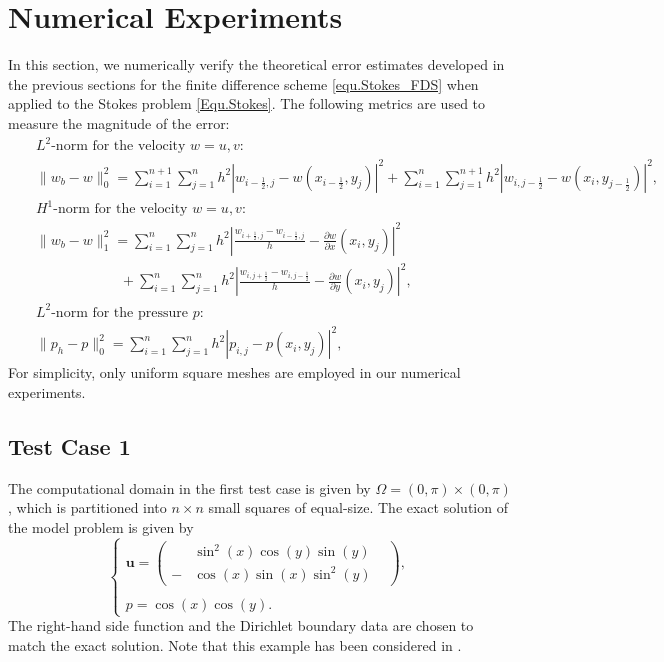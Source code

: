 \documentclass[final,leqno]{siamltex704}
\begin{document}
\section{Numerical Experiments}\label{numerical-experiments}
In this section, we numerically verify the theoretical error estimates developed in the previous sections for the finite difference scheme \eqref{equ.Stokes_FDS} when applied to the Stokes problem \eqref{Equ.Stokes}.
The following metrics are used to measure the magnitude of the error:
\begin{eqnarray*}
&&\text{$L^2$-norm for the velocity $w=u,v$: }\\
&&\|w_b-w\|_{0}^2=\sum_{i=1}^{n+1}\sum_{j=1}^{n}h^2|w_{i-\frac{1}{2},j}-w(x_{i-\frac{1}{2}},y_j)|^2  +\sum_{i=1}^{n}\sum_{j=1}^{n+1}h^2|w_{i,j-\frac{1}{2}}-w(x_{i},y_{j-\frac{1}{2}})|^2,\\
&&\text{$H^1$-norm for the velocity $w=u,v$: }\\
&&\|w_b-w\|_1^2=\sum_{i=1}^{n}\sum_{j=1}^{n} h^2\left|\frac{w_{i+\frac{1}{2},j}-w_{i-\frac{1}{2},j}}{h} - \frac{\partial w}{\partial x} (x_{i},y_{j})\right|^2 \nonumber\\
&&\qquad\qquad\qquad  + \sum_{i=1}^{n}\sum_{j=1}^{n} h^2\left|\frac{w_{i,j+\frac{1}{2}}-w_{i,j-\frac{1}{2}}}{h} - \frac{\partial w}{\partial y} (x_{i},y_{j})\right|^2,\\
&&\text{$L^2$-norm for the pressure $p$: }\\
&&\|p_h-p\|_0^2= \sum_{i=1}^{n}\sum_{j=1}^{n} h^2|p_{i,j}-p (x_{i},y_{j})|^2,
\end{eqnarray*}
For simplicity, only uniform square meshes are employed in our numerical experiments.

\subsection{Test Case 1}
The computational domain in the first test case is given by $\Omega=(0,\pi)\times (0,\pi)$, which is partitioned into $n\times n$ small squares of equal-size. The exact solution of the model problem is given by
\begin{equation*}
\left \{
\begin{array}{lll}
\bm{u} =\left(
\begin{array}{lll}
&\sin^2(x)\cos(y)\sin(y) &\\
-&\cos(x)\sin(x)\sin^2(y)&
\end{array}
\right),\\
~\\
p=\cos(x)\cos(y).
\end{array}
\right.
\end{equation*}
The right-hand side function and the Dirichlet boundary data are chosen to match the exact solution. Note that this example has been considered in \cite{RXZZ-JCAM-2016}.
\end{document}
